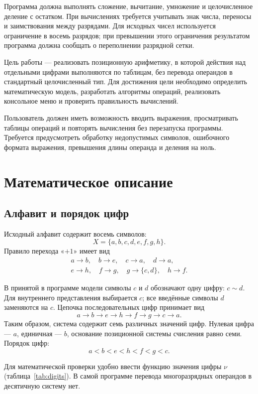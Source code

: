\documentclass[14pt,a4paper]{extarticle}
\begin{document}
Программа должна выполнять сложение, вычитание, умножение и целочисленное деление с остатком. При вычислениях требуется учитывать знак числа, переносы и заимствования между разрядами. Для исходных чисел используется ограничение в восемь разрядов; при превышении этого ограничения результатом программа должна сообщать о переполнении разрядной сетки.

Цель работы --- реализовать позиционную арифметику, в которой действия над отдельными цифрами выполняются по таблицам, без перевода операндов в стандартный целочисленный тип. Для достижения цели необходимо определить математическую модель, разработать алгоритмы операций, реализовать консольное меню и проверить правильность вычислений.

Пользователь должен иметь возможность вводить выражения, просматривать таблицы операций и повторять вычисления без перезапуска программы. Требуется предусмотреть обработку недопустимых символов, ошибочного формата выражения, превышения длины операнда и деления на ноль.

\section{Математическое описание}

\subsection{Алфавит и порядок цифр}

Исходный алфавит содержит восемь символов:
\[
X=\{a,b,c,d,e,f,g,h\}.
\]
Правило перехода «$+1$» имеет вид
\[
\begin{gathered}
a\to b,\quad b\to e,\quad c\to a,\quad d\to a,\\
e\to h,\quad f\to g,\quad g\to\{c,d\},\quad h\to f.
\end{gathered}
\]

В принятой в программе модели символы $c$ и $d$ обозначают одну цифру: $c\sim d$. Для внутреннего представления выбирается $c$; все введённые символы $d$ заменяются на $c$. Цепочка последовательных цифр принимает вид
\[
a\to b\to e\to h\to f\to g\to c\to a.
\]
Таким образом, система содержит семь различных значений цифр. Нулевая цифра --- $a$, единичная --- $b$, основание позиционной системы счисления равно семи. Порядок цифр:
\[
a<b<e<h<f<g<c.
\]

Для математической проверки удобно ввести функцию значения цифры $\nu$ (таблица~\ref{tab:digits}). В самой программе перевода многоразрядных операндов в десятичную систему нет.
\end{document}
